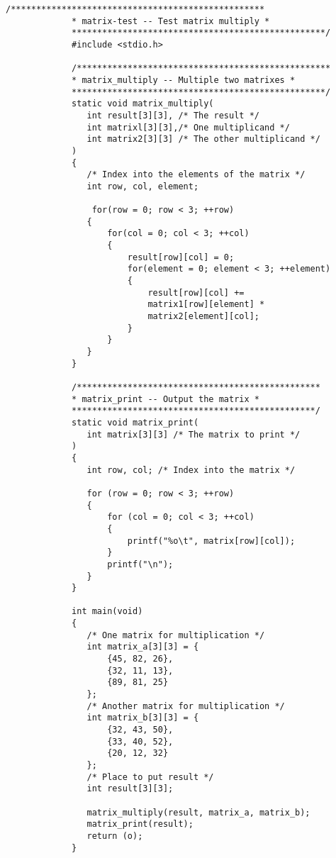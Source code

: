 \begin{LTR}
        \begin{lstlisting}[style=C++Style]
             /**************************************************
             * matrix-test -- Test matrix multiply *
             **************************************************/
             #include <stdio.h>

             /**************************************************
             * matrix_multiply -- Multiple two matrixes *
             **************************************************/
             static void matrix_multiply(
             	int result[3][3], /* The result */
             	int matrixl[3][3],/* One multiplicand */
             	int matrix2[3][3] /* The other multiplicand */
             )
             {
             	/* Index into the elements of the matrix */
             	int row, col, element;

            	 for(row = 0; row < 3; ++row)
             	{
             		for(col = 0; col < 3; ++col)
             		{
             			result[row][col] = 0;
             			for(element = 0; element < 3; ++element)
             			{
             				result[row][col] +=
             				matrix1[row][element] *
             				matrix2[element][col];
             			}
             		}
             	}
             }

             /************************************************
             * matrix_print -- Output the matrix *
             ************************************************/
             static void matrix_print(
             	int matrix[3][3] /* The matrix to print */
             )
             {
             	int row, col; /* Index into the matrix */

             	for (row = 0; row < 3; ++row)
             	{
             		for (col = 0; col < 3; ++col)
             		{
             			printf("%o\t", matrix[row][col]);
             		}
             		printf("\n");
             	}
             }

             int main(void)
             {
             	/* One matrix for multiplication */
             	int matrix_a[3][3] = {
             		{45, 82, 26},
             		{32, 11, 13},
             		{89, 81, 25}
             	};
             	/* Another matrix for multiplication */
             	int matrix_b[3][3] = {
             		{32, 43, 50},
             		{33, 40, 52},
             		{20, 12, 32}
             	};
             	/* Place to put result */
             	int result[3][3];

             	matrix_multiply(result, matrix_a, matrix_b);
             	matrix_print(result);
             	return (o);
             }
        \end{lstlisting}
\end{LTR}
